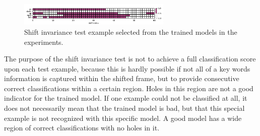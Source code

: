 \begin{figure}[!ht]
  \centering
    \includegraphics[width=0.65\textwidth]{./5_exp/figs/exp_fs_cepstral_tb_shift_conv-jim_mfcc12_norm0}
  \caption{Shift invariance test example selected from the trained models in the experiments.}
  \label{fig:exp_details_tb_shift}
\end{figure}
\FloatBarrier
\noindent
The purpose of the shift invariance test is not to achieve a full classification score upon each test example, because this is hardly possible if not all of a key words information is captured within the shifted frame, but to provide consecutive correct classifications within a certain region.
Holes in this region are not a good indicator for the trained model.
If one example could not be classified at all, it does not necessarily mean that the trained model is bad, but that this special example is not recognized with this specific model.
A good model has a wide region of correct classifications with no holes in it.



